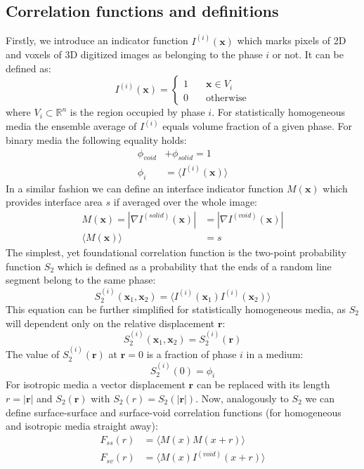 \documentclass[reprint,amsmath,amssymb,aps,pre,showkeys,showpacs]{revtex4-1}
\begin{document}
\subsection{Correlation functions and definitions}
\label{sec:definitions}
Firstly, we introduce an indicator function $I^{(i)}(\mathbf{x})$ which marks
pixels of 2D and voxels of 3D digitized images as belonging to the phase $i$ or
not. It can be defined as:
\begin{equation*}
  I^{(i)}(\mathbf{x}) = \left\{
  \begin{array}{ll}
    1 & \quad \mathbf{x} \in V_i \\
    0 & \quad \text{otherwise}
  \end{array}
  \right.
\end{equation*}
where $V_i \subset \mathbb{R}^n$ is the region occupied by phase $i$. For
statistically homogeneous media the ensemble average of $I^{(i)}$ equals volume
fraction of a given phase. For binary media the following equality holds:
\begin{align*}
  \phi_{void} &+ \phi_{solid} = 1 \\
  \phi_i &= \langle I^{(i)}(\mathbf{x}) \rangle
\end{align*}
In a similar fashion we can define an interface indicator function
$M(\mathbf{x})$ which provides interface area $s$ if averaged over the whole
image:
\begin{align}
  M(\mathbf{x}) = |\nabla I^{(solid)}(\mathbf{x})| &= |\nabla I^{(void)}(\mathbf{x})|
  \label{eq:interface} \\
  \langle M(\mathbf{x}) \rangle &= s
  \label{eq:surface}
\end{align}
The simplest, yet foundational correlation function is the two-point probability
function $S_2$ which is defined as a probability that the ends of a random line
segment belong to the same phase:
\begin{equation}
  S_2^{(i)}(\mathbf{x}_1, \mathbf{x}_2) = \langle I^{(i)}(\mathbf{x}_1)
  I^{(i)}(\mathbf{x}_2) \rangle \label{eq:twopoint}
\end{equation}
This equation can be further simplified for statistically homogeneous media, as
$S_2$ will dependent only on the relative displacement $\mathbf{r}$:
\begin{equation*}
  S_2^{(i)}(\mathbf{x}_1, \mathbf{x}_2) = S_2^{(i)}(\mathbf{r})
\end{equation*}
The value of $S^{(i)}_2(\mathbf{r})$ at $\mathbf{r} = 0$ is a fraction of phase
$i$ in a medium:
\begin{equation*}
  S_2^{(i)}(0) = \phi_i
\end{equation*}
For isotropic media a vector displacement $\mathbf{r}$ can be replaced with its
length $r = |\mathbf{r}|$ and $S_2(\mathbf{r})$ with $S_2(r) = S_2(|\mathbf{r}|)$.
Now, analogously to $S_2$ we can define surface-surface and surface-void
correlation functions (for homogeneous and isotropic media straight away):
\begin{align}
  F_{ss}(r) &= \langle M(x)M(x+r) \rangle \label{eq:fss} \\
  F_{sv}(r) &= \langle M(x)I^{(void)}(x+r) \label{eq:fsv} \rangle
\end{align}
\end{document}
